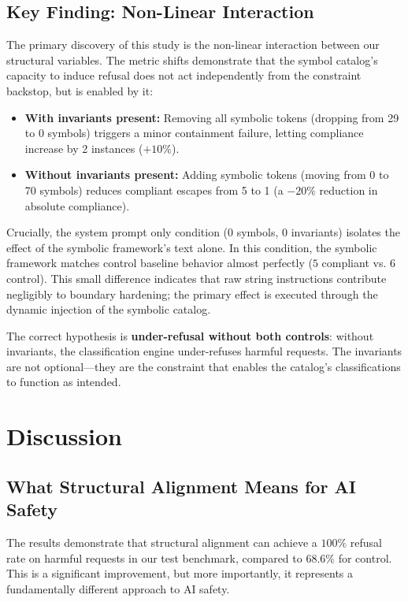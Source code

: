 \documentclass[11pt]{article}
\begin{document}
\subsection{Key Finding: Non-Linear Interaction}

The primary discovery of this study is the non-linear interaction between our structural variables. The metric shifts demonstrate that the symbol catalog's capacity to induce refusal does not act independently from the constraint backstop, but is enabled by it:
\begin{itemize}
    \item \textbf{With invariants present:} Removing all symbolic tokens (dropping from 29 to 0 symbols) triggers a minor containment failure, letting compliance increase by 2 instances ($+10\%$).
    \item \textbf{Without invariants present:} Adding symbolic tokens (moving from 0 to 70 symbols) reduces compliant escapes from 5 to 1 (a $-20\%$ reduction in absolute compliance).
\end{itemize}

Crucially, the system prompt only condition (0 symbols, 0 invariants) isolates the effect of the symbolic framework's text alone. In this condition, the symbolic framework matches control baseline behavior almost perfectly ($5$ compliant vs. $6$ control). This small difference indicates that raw string instructions contribute negligibly to boundary hardening; the primary effect is executed through the dynamic injection of the symbolic catalog.

The correct hypothesis is \textbf{under-refusal without both controls}: without invariants, the classification engine under-refuses harmful requests. The invariants are not optional—they are the constraint that enables the catalog's classifications to function as intended.

\section{Discussion}

\subsection{What Structural Alignment Means for AI Safety}

The results demonstrate that structural alignment can achieve a $100\%$ refusal rate on harmful requests in our test benchmark, compared to $68.6\%$ for control. This is a significant improvement, but more importantly, it represents a fundamentally different approach to AI safety.
\end{document}
